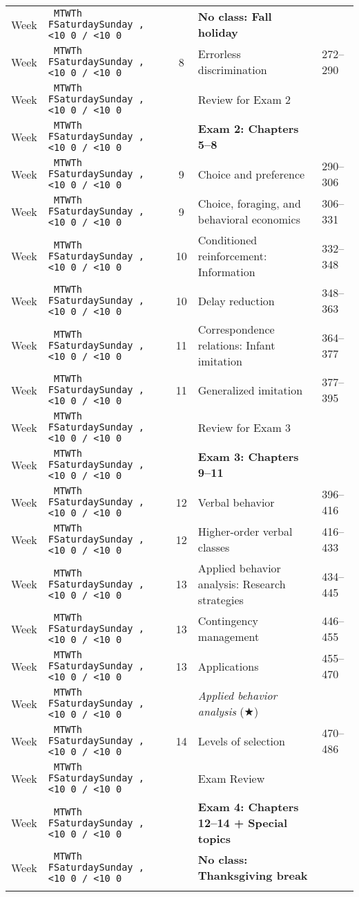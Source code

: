 \documentclass[11pt]{article}
\newcommand{\setdatenextclassMWF}{
	\ifcase\thedatedayname\relax\or
	\addtocounter{datenumber}{2}
	\or\addtocounter{datenumber}{1}
	\or\addtocounter{datenumber}{2}
	\or\addtocounter{datenumber}{1}
	\or\addtocounter{datenumber}{3}
	\or\addtocounter{datenumber}{2}
	\or\addtocounter{datenumber}{1}
	\fi 
	\setdatebynumber{\thedatenumber}
}
\newcommand{\dayabbrev}{%
	\ifcase\thedatedayname \or
	M\or T\or W\or Th\or
	F\or Saturday\or Sunday\fi
}%
\newcommand{\monthday}{%
	\ifnum\value{datemonth}<10 0\fi
	\thedatemonth/%
	\ifnum\value{dateday}<10 0\fi
	\thedateday%
}%
\newcounter{courseweeknumber}
\newcommand{\schedulerow}[3]{
	\ifnum\thedatedayname=1\stepcounter{courseweeknumber}Week \thecourseweeknumber\fi%
	& \texttt{\dayabbrev, \monthday} & #2 & #1 & #3\tabularnewline%
}%
\renewcommand{\star}{$\bigstar$}
\begin{document}
\begin{table}
{\begin{tabular}{rlcll}
		\schedulerow{\textcolor{lsupurple}{\textbf{No class: Fall holiday}}}{}{}
		\setdatenextclassMWF

		\schedulerow{Errorless discrimination }{8}{272--290}
		\setdatenextclassMWF
		
		\schedulerow{Review for Exam 2}{}{}
		\setdatenextclassMWF
		
		\schedulerow{\textbf{Exam 2: Chapters 5--8}}{}{}
		\setdatenextclassMWF
		
		\schedulerow{Choice and preference }{9}{290--306}
		\setdatenextclassMWF
		
		\schedulerow{Choice, foraging, and behavioral economics }{9}{306--331}
		\setdatenextclassMWF
		
		\schedulerow{Conditioned reinforcement: Information }{10}{332--348}
		\setdatenextclassMWF
		
		\schedulerow{Delay reduction }{10}{348--363}
		\setdatenextclassMWF
		
		\schedulerow{Correspondence relations: Infant imitation }{11}{364--377}
		\setdatenextclassMWF
		
		\schedulerow{Generalized imitation }{11}{377--395}
		\setdatenextclassMWF
		
		\schedulerow{Review for Exam 3}{}{}
		\setdatenextclassMWF
		
		\schedulerow{\textbf{Exam 3: Chapters 9--11}}{}{}
		\setdatenextclassMWF
		
		\schedulerow{Verbal behavior }{12}{396--416}
		\setdatenextclassMWF
		
		\schedulerow{Higher-order verbal classes }{12}{416--433}
		\setdatenextclassMWF
		
		\schedulerow{Applied behavior analysis: Research strategies }{13}{434--445}
		\setdatenextclassMWF
		
		\schedulerow{Contingency management }{13}{446--455}
		\setdatenextclassMWF
		
		\schedulerow{Applications }{13}{455--470}
		\setdatenextclassMWF
		
		\schedulerow{\emph{Applied behavior analysis} (\star)}{}{}
		\setdatenextclassMWF
		
		\schedulerow{Levels of selection }{14}{470--486}
		\setdatenextclassMWF

		\schedulerow{Exam Review}{}{}
		\setdatenextclassMWF
		
		\schedulerow{\textbf{Exam 4: Chapters 12--14 + Special topics}}{}{}
		\setdatenextclassMWF	

		\schedulerow{\textcolor{lsupurple}{\textbf{No class: Thanksgiving break}}}{}{}
		\setdatenextclassMWF


\end{tabular}}
\end{table}
\end{document}
